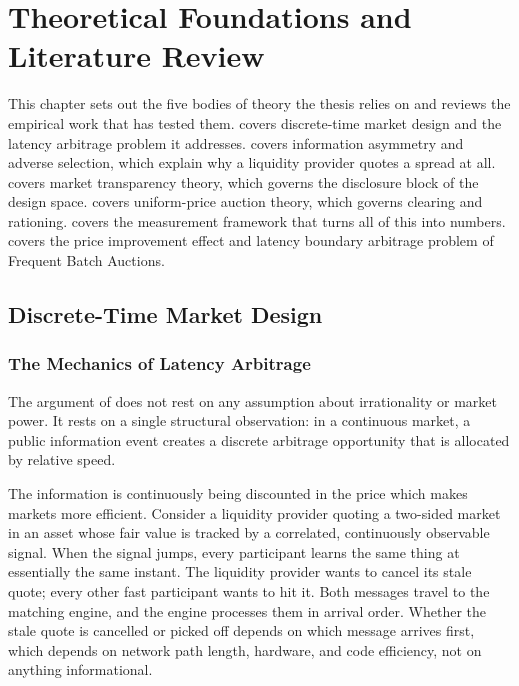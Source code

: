 \chapter{Theoretical Foundations and Literature Review}
\label{ch:foundations}

This chapter sets out the five bodies of theory the thesis relies on and
reviews the empirical work that has tested them. 
covers discrete-time market design and the latency arbitrage problem it
addresses.  covers information asymmetry and adverse
selection, which explain why a liquidity provider quotes a spread at
all.  covers market transparency theory, which
governs the disclosure block of the design space.
 covers uniform-price auction theory, which
governs clearing and rationing.  covers the
measurement framework that turns all of this into numbers. covers the price improvement effect and latency boundary arbitrage problem of Frequent Batch Auctions.


\section{Discrete-Time Market Design}
\label{sec:discretetime}

\subsection{The Mechanics of Latency Arbitrage }

The argument of \citet{budish2015hft} does not rest on any assumption
about irrationality or market power. It rests on a single structural
observation: in a continuous market, a public information event creates
a discrete arbitrage opportunity that is allocated by relative speed.

The information is continuously being discounted in the price which makes markets more efficient. Consider a liquidity provider quoting a two-sided market in an asset
whose fair value is tracked by a correlated, continuously observable
signal. When the signal jumps, every participant learns the same thing
at essentially the same instant. The liquidity provider wants to cancel
its stale quote; every other fast participant wants to hit it. Both
messages travel to the matching engine, and the engine processes them in
arrival order. Whether the stale quote is cancelled or picked off
depends on which message arrives first, which depends on network path
length, hardware, and code efficiency, not on anything informational.

